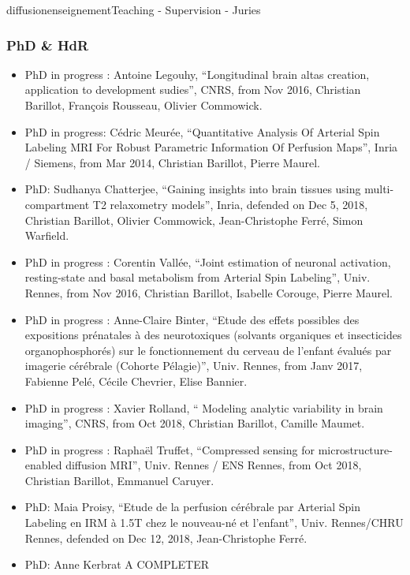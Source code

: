 \documentclass{ra2018}
\begin{document}
\begin{module}{diffusion}{enseignement}{Teaching - Supervision - Juries}
 \subsubsection{PhD \& HdR}
 \begin{itemize}
           \item PhD in progress : Antoine Legouhy, ``Longitudinal brain altas creation, application to development sudies'', CNRS, from Nov 2016, Christian Barillot, François Rousseau, Olivier Commowick.
           \item PhD in progress: Cédric Meurée, ``Quantitative Analysis Of Arterial Spin Labeling MRI For Robust Parametric Information Of Perfusion Maps'', Inria / Siemens, from Mar 2014, Christian Barillot, Pierre Maurel.
	   \item PhD: Sudhanya Chatterjee, ``Gaining insights into brain tissues using multi-compartment T2 relaxometry models'', Inria, defended on Dec 5, 2018, Christian Barillot, Olivier Commowick, Jean-Christophe Ferré, Simon Warfield.
           \item PhD in progress : Corentin Vallée, ``Joint estimation of neuronal activation, resting-state and basal metabolism from Arterial Spin Labeling'', Univ. Rennes, from Nov 2016, Christian Barillot, Isabelle Corouge, Pierre Maurel.
           \item PhD in progress : Anne-Claire Binter, ``Etude des effets possibles des expositions prénatales à des neurotoxiques (solvants organiques et insecticides organophosphorés) sur le fonctionnement du cerveau de l’enfant évalués par imagerie cérébrale (Cohorte Pélagie)'', Univ. Rennes, from Janv 2017, Fabienne Pelé, Cécile Chevrier, Elise Bannier.
           \item PhD in progress : Xavier Rolland, `` Modeling analytic variability in brain imaging'', CNRS, from Oct 2018, Christian Barillot, Camille Maumet.
           \item PhD in progress : Raphaël Truffet, ``Compressed sensing for microstructure-enabled diffusion MRI'', Univ. Rennes / ENS Rennes, from Oct 2018, Christian Barillot, Emmanuel Caruyer.
  	   \item PhD: Maia Proisy, ``Etude de la perfusion cérébrale par Arterial Spin Labeling en IRM à 1.5T chez le nouveau-né et l'enfant'', Univ. Rennes/CHRU Rennes, defended on Dec 12, 2018, Jean-Christophe Ferré. 
	   \item PhD: Anne Kerbrat A COMPLETER
  \end{itemize}


\end{module}
\end{document}
